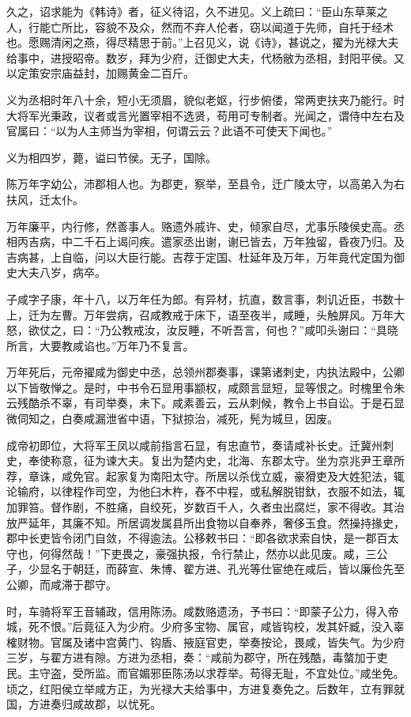 \documentclass[]{article}
\begin{document}
久之，诏求能为《韩诗》者，征义待诏，久不进见。义上疏曰：``臣山东草莱之人，行能亡所比，容貌不及众，然而不弃人伦者，窃以闻道于先师，自托于经术也。愿赐清闲之燕，得尽精思于前。''上召见义，说《诗》，甚说之，擢为光禄大夫给事中，进授昭帝。数岁，拜为少府，迁御史大夫，代杨敝为丞相，封阳平侯。又以定策安宗庙益封，加赐黄金二百斤。

义为丞相时年八十余，短小无须眉，貌似老妪，行步俯偻，常两吏扶夹乃能行。时大将军光秉政，议者或言光置宰相不选贤，苟用可专制者。光闻之，谓侍中左右及官属曰：``以为人主师当为宰相，何谓云云？此语不可使天下闻也。''

义为相四岁，薨，谥曰节侯。无子，国除。

陈万年字幼公，沛郡相人也。为郡吏，察举，至县令，迁广陵太守，以高弟入为右扶风，迁太仆。

万年廉平，内行修，然善事人。赂遗外戚许、史，倾家自尽，尤事乐陵侯史高。丞相丙吉病，中二千石上谒问疾。遣家丞出谢，谢已皆去，万年独留，昏夜乃归。及吉病甚，上自临，问以大臣行能。吉荐于定国、杜延年及万年，万年竟代定国为御史大夫八岁，病卒。

子咸字子康，年十八，以万年任为郎。有异材，抗直，数言事，刺讥近臣，书数十上，迁为左曹。万年尝病，召咸教戒于床下，语至夜半，咸睡，头触屏风。万年大怒，欲仗之，曰：``乃公教戒汝，汝反睡，不听吾言，何也？''咸叩头谢曰：``具晓所言，大要教咸谄也。''万年乃不复言。

万年死后，元帝擢咸为御史中丞，总领州郡奏事，课第诸刺史，内执法殿中，公卿以下皆敬惮之。是时，中书令石显用事颛权，咸颇言显短，显等恨之。时槐里令朱云残酷杀不辜，有司举奏，未下。咸素善云，云从刺候，教令上书自讼。于是石显微伺知之，白奏咸漏泄省中语，下狱掠治，减死，髡为城旦，因废。

成帝初即位，大将军王凤以咸前指言石显，有忠直节，奏请咸补长史。迁冀州刺史，奉使称意，征为谏大夫。复出为楚内史，北海、东郡太守。坐为京兆尹王章所荐，章诛，咸免官。起家复为南阳太守。所居以杀伐立威，豪猾吏及大姓犯法，辄论输府，以律程作司空，为他臼木杵，舂不中程，或私解脱钳釱，衣服不如法，辄加罪笞。督作剧，不胜痛，自绞死，岁数百千人，久者虫出腐烂，家不得收。其治放严延年，其廉不知。所居调发属县所出食物以自奉养，奢侈玉食。然操持掾史，郡中长吏皆令闭门自敛，不得逾法。公移敕书曰：``即各欲求索自快，是一郡百太守也，何得然哉！''下吏畏之，豪强执报，令行禁止，然亦以此见废。咸，三公子，少显名于朝廷，而薛宣、朱博、翟方进、孔光等仕宦绝在咸后，皆以廉俭先至公卿，而咸滞于郡守。

时，车骑将军王音辅政，信用陈汤。咸数赂遗汤，予书曰：``即蒙子公力，得入帝城，死不恨。''后竟征入为少府。少府多宝物、属官，咸皆钩校，发其奸臧，没入辜榷财物。官属及诸中宫黄门、钩盾、掖庭官吏，举奏按论，畏咸，皆失气。为少府三岁，与翟方进有隙。方进为丞相，奏：``咸前为郡守，所在残酷，毒螫加于吏民。主守盗，受所监。而官媚邪臣陈汤以求荐举。苟得无耻，不宜处位。''咸坐免。顷之，红阳侯立举咸方正，为光禄大夫给事中，方进复奏免之。后数年，立有罪就国，方进奏归咸故郡，以忧死。
\end{document}
